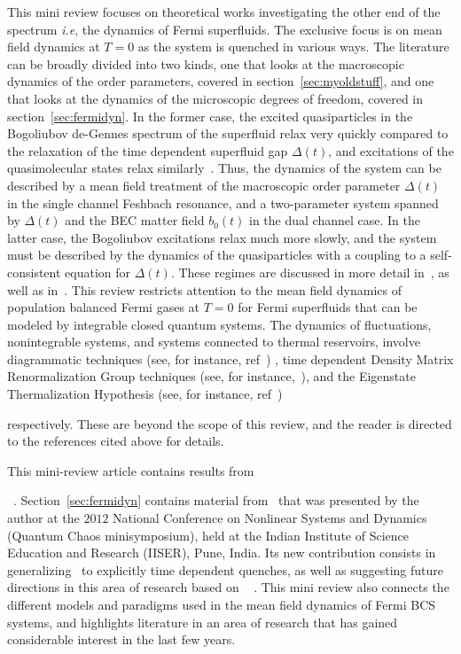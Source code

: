 \documentclass[aps,pra,floats,epsfig,pdflatex]{revtex4}                                                              %
\begin{document}
This mini review focuses on theoretical works investigating the other end of the spectrum \textit{i.e}, the dynamics of Fermi superfluids. The exclusive focus is on mean field dynamics at $T=0$ as the system is quenched in various ways. The literature can be broadly divided into two kinds, one that looks at the macroscopic dynamics of the order parameters, covered in section~\ref{sec:myoldstuff},  {and one that looks at the dynamics of the microscopic degrees of freedom, covered in section}~\ref{sec:fermidyn}.  {In the former case, the excited quasiparticles in the Bogoliubov de-Gennes spectrum of the superfluid relax very quickly compared to the relaxation of the time dependent superfluid gap $\Delta(t)$, and excitations of the quasimolecular states relax similarly}~\cite{myrefs, huang:becbcs2}. Thus, the dynamics of the system can be described by a mean field treatment of the macroscopic order parameter $\Delta(t)$ in the single channel Feshbach resonance, and a two-parameter  system spanned by $\Delta(t)$ 
and the BEC matter field $b_0(t)$ in the dual channel case. In the latter case, the Bogoliubov excitations relax much more slowly, and the system must be described by the dynamics of the quasiparticles with a coupling to a self-consistent equation for $\Delta(t)$. These regimes are discussed in more detail in~\cite{abrahams,barankov, andreev:noneqmbcsbec, gorkov, volkov}, as well as in~\cite{aronov,lo}.  {This review restricts attention to the mean field dynamics of population balanced Fermi gases at $T=0$ for Fermi superfluids that can be modeled by integrable closed quantum systems. The dynamics of fluctuations, nonintegrable systems, and systems connected to thermal reservoirs, involve diagrammatic techniques} (see, for instance, ref~\cite{gorkov}) , time dependent Density Matrix Renormalization Group techniques (see, for instance,~\cite{dmrg:review}), and the Eigenstate Thermalization Hypothesis (see, for instance, ref~\cite{krishrev})  { respectively. These are beyond 
the scope of this review, and the reader is directed to the references cited above for details.

This mini-review article contains results from}~\cite{abrahams,barankov,arnab1,mypaper4,ourpaper}. Section~\ref{sec:fermidyn} contains material from~\cite{ourpaper} that was presented by the author at the $2012$ National Conference on Nonlinear Systems and Dynamics (Quantum Chaos minisymposium), held at the Indian Institute of Science Education and Research (IISER), Pune, India.  { Its new contribution consists in generalizing}~\cite{barankov} {to explicitly time dependent quenches, as well as suggesting future directions in this area of research based on }~\cite{volkov,barankov,ourpaper} {. This mini review also connects the different models and paradigms used in the mean field dynamics of Fermi BCS systems, and highlights literature in an area of research that has gained considerable interest in the last few years.}
\end{document}
